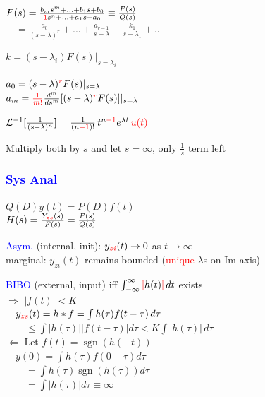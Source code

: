 \documentclass[4pt]{article}
\theoremstyle{definition}
\theoremstyle{definition}
\newcommand{\ra}{\rightarrow}
\DeclareMathOperator{\sgn}{sgn}
\newcommand{\red}[1]{\textcolor{red}{#1}}
\newcommand{\blue}[1]{\textcolor{blue}{#1}}
\begin{document}
\begin{landscape}
\begin{multicols}{3}
    \(F(s) = \frac{b_ms^m + ... + b_1s + b_0}{\red 1 s^n + ... + a_1s + a_0} \equiv \frac{P(s)}{Q(s)}\)\\
        \(\hspace{1em} = \frac{a_0}{(s-\lambda)^r} + ... + \frac{a_{r-1}}{s-\lambda} + \frac{k_1}{s-\lambda_1} + ..\)

        \hspace{1em} \(k = (s-\lambda_i) F(s) | _{s = \lambda_i}\)

        \hspace{1em} \(a_0 = (s-\lambda)^{\red r} F(s)|_{s=\lambda}\)\\
        \hspace{1em} \(a_m = \red{\frac 1 {m!}} \frac{d^m}{ds^m}[(s-\lambda)^{\red r} F(s)] |_{s = \lambda}\)

    \(\mathcal L^{-1} [\frac{1}{(s-\lambda)^n}] = \frac{1}{(n\red{-1})!} \, t^{n\red{-1}} e^{\lambda t} \, \red{u(t)}\)

    Multiply both by $s$ and let $s=\infty$, only $\frac{1}{s}$ term left 
\newpage
\subsubsection*{\blue{Sys Anal}}
    \(Q(D) y(t) = P(D) f(t)\)\\
    $H(s) = \frac{Y_{\red{zs}}(s)}{F(s)} = \frac{P(s)}{Q(s)}$       %

    \blue{Asym.} (internal, init): $y_{\red{zi}}(t) \ra 0$ as $t\ra \infty$\\
    marginal: $y_{zi}(t)$ remains bounded (\red{unique} $\lambda$s on Im axis)

    \blue{BIBO} (external, input) iff \(\int_{-\infty}^{\infty} \red{|} h(t) \red{|} \, dt\) exists\\ 
    $\Rightarrow$ $|f(t)| < K$\\                       
    \(\hspace{1em}y_{\red{zs}}(t) = h * f= \int h(\tau) f(t-\tau) \, d\tau\)\\
    \(\hspace{2em} \leq \int |h(\tau)||f(t-\tau)| d\tau < K \int |h(\tau)| \, d\tau\)\\
    $\Leftarrow$ Let $f(t) = \sgn(h(-t))$\\                %
    \(\hspace{1em} y(0) = \int h(\tau) f(0-\tau) d\tau\)\\
    \(\hspace{2em} = \int h(\tau) \sgn(h(\tau)) d\tau\)\\
    \(\hspace{2em} = \int |h(\tau)| d\tau \equiv \infty\)


\end{multicols}
\end{landscape}
\end{document}
